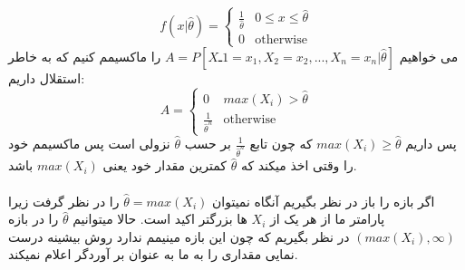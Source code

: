 \problem{}
\subproblem{}
\[
    f(x|\hat{\theta}) =
    \begin{cases}
        \frac{1}{\hat{\theta}} &  0\leq x\leq \hat{\theta}\\
        0 & \text{otherwise}
    \end{cases}
\]
می خواهیم $A = P[Xـ1 =x_1,X_2 = x_2,...,X_n= x_n|\hat{\theta}]$ را ماکسیمم کنیم که به خاطر استقلال داریم:\\
\[
    A =
    \begin{cases}
        0 &  max(X_i) > \hat{\theta}\\
        \frac{1}{{\hat{\theta}}^n} & \text{otherwise}
    \end{cases}
\]
پس داریم $max(X_i) \geq \hat{\theta}$ که چون تابع $\frac{1}{{\hat{\theta}}^n}$
بر حسب $\hat{\theta}$ نزولی است پس ماکسیمم خود را وقتی اخذ میکند که $\hat{\theta}$
کمترین مقدار خود یعنی $max(X_i)$ باشد.
\\\\
\subproblem{}
اگر بازه را باز در نظر بگیریم آنگاه نمیتوان $\hat{\theta} = max(X_i)$
را در نظر گرفت زیرا پارامتر ما از هر یک از $X_i$ ها بزرگتر اکید است.
حالا میتوانیم $\hat{\theta}$
را در بازه $(max(X_i),\infty)$ در نظر بگیریم 
که چون این بازه مینیمم ندارد روش بیشینه درست نمایی مقداری را به ما به عنوان
بر آوردگر اعلام نمیکند.
